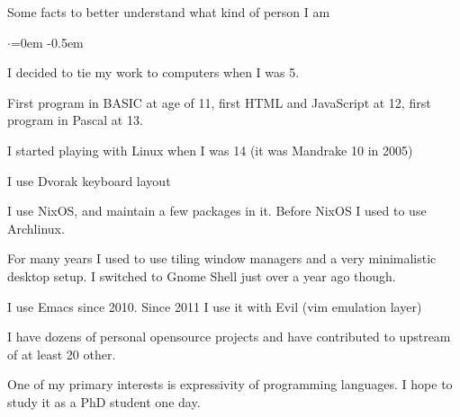 \documentclass{resume} %
\begin{document}
\begin{rSection}{Some facts to better understand what kind of person I am}
  \smallskip
  \begin{list}{$\cdot$}{\leftmargin=0em} %
    \itemsep -0.5em \vspace{-0.5em} %
  \item I decided to tie my work to computers when I was 5.
  \item First program in BASIC at age of 11, first HTML and JavaScript at 12, first program in Pascal at 13.
  \item I started playing with Linux when I was 14 (it was Mandrake 10 in 2005)
  \item I use Dvorak keyboard layout
  \item I use NixOS, and maintain a few packages in it. Before NixOS I used to use Archlinux.
  \item For many years I used to use tiling window managers and a very minimalistic desktop setup. I switched to Gnome Shell just over a year ago though.
  \item I use Emacs since 2010. Since 2011 I use it with Evil (vim emulation layer)
  \item I have dozens of personal opensource projects and have contributed to
        upstream of at least 20 other.
  \item One of my primary interests is expressivity of programming languages. I hope to study it as a PhD student one day.
  \end{list}
\end{rSection}
\end{document}
